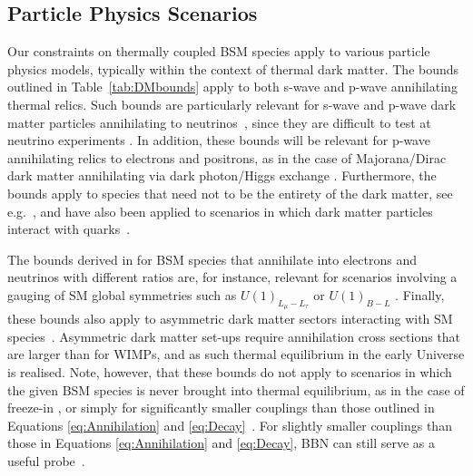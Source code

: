\subsection{Particle Physics Scenarios} 

Our constraints on thermally coupled BSM species apply to various particle physics models, typically within the context of thermal dark matter. The bounds outlined in Table~\ref{tab:DMbounds} apply to both s-wave and p-wave annihilating thermal relics. Such bounds are particularly relevant for s-wave and p-wave dark matter particles annihilating to neutrinos~\cite{Boehm:2006mi,Farzan:2009ji,Farzan:2011ck,Batell:2017cmf,Ballett:2019cqp}, since they are difficult to test at neutrino experiments \cite{Kamada:2015era,Arguelles:2017atb,Alvey:2019jzx,Klop:2018ltd,Kelly:2019wow}. In addition, these bounds will  be relevant for p-wave annihilating relics to electrons and positrons, as in the case of Majorana/Dirac dark matter annihilating via dark photon/Higgs exchange \cite{Krnjaic:2015mbs,Alexander:2016aln,Battaglieri:2017aum,Beacham:2019nyx}. Furthermore, the bounds apply to species that need not to be the entirety of the dark matter, see e.g.~\cite{Berlin:2018sjs}, and have also been applied to scenarios in which dark matter particles interact with  quarks~\cite{Krnjaic:2019dzc}. 

The bounds derived in \cite{Sabti:2019mhn} for BSM species that annihilate into electrons and neutrinos with different ratios are, for instance, relevant for scenarios involving a gauging of SM global symmetries such as $U(1)_{L_\mu-L_\tau}$ \cite{Arcadi:2018tly,Kamada:2018zxi,Foldenauer:2018zrz} or $U(1)_{B-L}$ \cite{Okada:2010wd,Escudero:2018fwn}. Finally, these bounds also apply to asymmetric dark matter sectors interacting with SM species~\cite{Zurek:2013wia,Petraki:2013wwa}. Asymmetric dark matter set-ups require annihilation cross sections that are larger than for WIMPs, and as such thermal equilibrium in the early Universe is realised. Note, however, that these bounds do not apply to scenarios in which the given BSM species is never brought into thermal equilibrium, as in the case of freeze-in \cite{Hall:2009bx,Dvorkin:2019zdi}, or simply for significantly smaller couplings than those outlined in Equations \eqref{eq:Annihilation} and \eqref{eq:Decay}~\cite{Berlin:2017ftj}. For slightly smaller couplings than those in Equations \eqref{eq:Annihilation} and \eqref{eq:Decay}, BBN can still serve as a useful probe~\cite{Berlin:2019pbq}.


